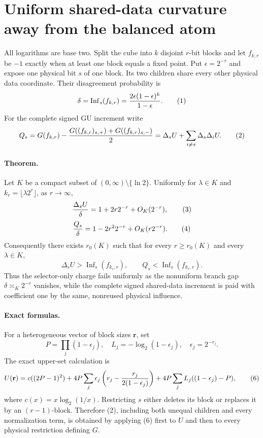 \section*{Uniform shared-data curvature away from the balanced atom}

All logarithms are base two.  Split the cube into $k$ disjoint $r$-bit
blocks and let $f_{k,r}$ be $-1$ exactly when at least one block equals a
fixed point.  Put $\epsilon=2^{-r}$ and expose one physical bit $s$ of
one block.  Its two children share every other physical data coordinate.
Their disagreement probability is
\[
 \delta=\operatorname{Inf}_s(f_{k,r})
 ={2\epsilon(1-\epsilon)^k\over1-\epsilon}.           \tag{1}
\]
For the complete signed GU increment write
\[
 Q_s=G(f_{k,r})-
 {G((f_{k,r})_{s,+})+G((f_{k,r})_{s,-})\over2}
 =\Delta_sU+\sum_{i\ne s}\Delta_s\Delta_iU.          \tag{2}
\]

\paragraph{Theorem.}
Let $K$ be a compact subset of
$(0,\infty)\setminus\{\ln2\}$.  Uniformly for $\lambda\in K$ and
$k_r=\lfloor\lambda2^r\rfloor$, as $r\to\infty$,
\[
 {\Delta_sU\over\delta}
 =1+2r2^{-r}+O_K(2^{-r}),                              \tag{3}
\]
\[
 {Q_s\over\delta}
 =1-2r^2 2^{-r}+O_K(r2^{-r}).                          \tag{4}
\]
Consequently there exists $r_0(K)$ such that for every
$r\ge r_0(K)$ and every $\lambda\in K$,
\[
 \boxed{\Delta_sU>\operatorname{Inf}_s(f_{k_r,r}),
 \qquad Q_s<\operatorname{Inf}_s(f_{k_r,r}).}          \tag{5}
\]
Thus the selector-only charge fails uniformly as the nonuniform branch
gap $\delta\asymp_K2^{-r}$ vanishes, while the complete signed shared-data
increment is paid with coefficient one by the same, nonreused physical
influence.

\paragraph{Exact formulas.}
For a heterogeneous vector of block sizes $\mathbf r$, set
\[
 P=\prod_j(1-\epsilon_j),\quad
 L_j=-\log_2(1-\epsilon_j),\quad
 \epsilon_j=2^{-r_j}.
\]
The exact upper-set calculation is
\[
 U(\mathbf r)=c((2P-1)^2)
 +4P\sum_j\epsilon_j\left(r_j-{r_j\over2(1-\epsilon_j)}\right)
 +4P\sum_jL_j((1-\epsilon_j)-P),                       \tag{6}
\]
where $c(x)=x\log_2(1/x)$.  Restricting $s$ either deletes its block or
replaces it by an $(r-1)$-block.  Therefore (2), including both unequal
children and every normalization term, is obtained by applying (6) first
to $U$ and then to every physical restriction defining $G$.

